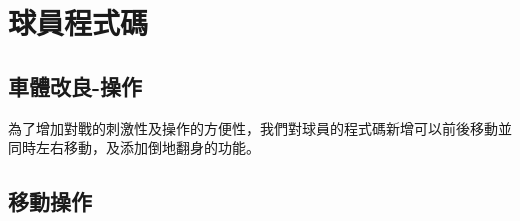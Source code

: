 \chapter{球員程式碼}
\renewcommand{\baselinestretch}{10.0} %
\setcounter{page}{4}  %
\fontsize{14pt}{2.5pt}\sectionef
\section{車體改良-操作}
  為了增加對戰的刺激性及操作的方便性，我們對球員的程式碼新增可以前後移動並同時左右移動，及添加倒地翻身的功能。\\[1pt]

\section{移動操作}
















